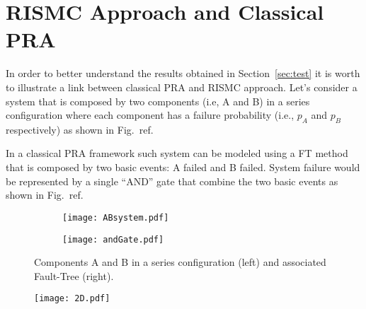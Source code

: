 \section{RISMC Approach and Classical PRA}
\label{sec:analogy}

In order to better understand the results obtained in Section~\ref{sec:test} it is worth to illustrate 
a link between classical PRA and RISMC approach.
Let's consider a system that is composed by two components (i.e, A and B) in a series configuration where
each component has a failure probability (i.e., $p_A$ and $p_B$ respectively) as shown in Fig.~ref{}.

In a classical PRA framework such system can be modeled using a FT method that is composed by two basic events:
A failed and B failed.
System failure would be represented by a single ``AND'' gate that combine the two basic events as shown in 
Fig.~ref{}.

\begin{figure}
  \centering
  \begin{subfigure}{.5\textwidth}
    \centering
    \texttt{[image: ABsystem.pdf]}
    \label{fig:sub1}
  \end{subfigure}%
  \begin{subfigure}{.5\textwidth}
    \centering
    \texttt{[image: andGate.pdf]}
    \label{fig:sub2}
  \end{subfigure}
  \caption{Components A and B in a series configuration (left) and associated Fault-Tree (right).}
  \label{fig:chebyshev}
\end{figure}

\begin{figure}
    \centering
    \texttt{[image: 2D.pdf]}
    \caption{}
    \label{fig:2Danalogy}
\end{figure} 



